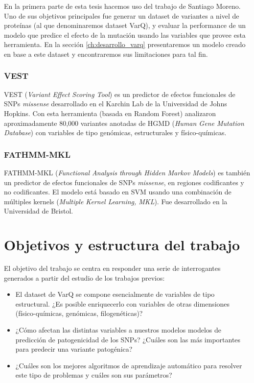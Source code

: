 En la primera parte de esta tesis hacemos uso del trabajo de Santiago Moreno. Uno de sus objetivos principales fue generar un dataset de variantes a nivel de proteínas (al que denominaremos dataset VarQ), y evaluar la performance de un modelo que predice el efecto de la mutación usando las variables que provee esta herramienta. En la sección \ref{ch:desarrollo_varq} presentaremos un modelo creado en base a este dataset y encontraremos sus limitaciones para tal fin.

\subsubsection{VEST}

VEST (\textit{Variant Effect Scoring Tool}) \cite{Carter2013} es un predictor de efectos funcionales de SNPs \textit{missense} desarrollado en el Karchin Lab de la Universidad de Johns Hopkins. Con esta herramienta (basada en Random Forest) analizaron aproximadamente 80,000 variantes anotadas de HGMD (\textit{Human Gene Mutation Database}) con variables de tipo genómicas, estructurales y físico-químicas.

\subsubsection{FATHMM-MKL}

FATHMM-MKL (\textit{Functional Analysis through Hidden Markov Models}) \cite{Shihab2015} es también un predictor de efectos funcionales de SNPs \textit{missense}, en regiones codificantes y no codificantes. El modelo está basado en SVM usando una combinación de múltiples kernels (\textit{Multiple Kernel Learning, MKL}). Fue desarrollado en la Universidad de Bristol. 



\section{Objetivos y estructura del trabajo}

El objetivo del trabajo se centra en responder una serie de interrogantes generados a partir del estudio de los trabajos previos:

\begin{itemize}
    \item El dataset de VarQ se compone esencialmente de variables de tipo estructural. ¿Es posible enriquecerlo con variables de otras dimensiones (físico-químicas, genómicas, filogenéticas)?
    \item ¿Cómo afectan las distintas variables a nuestros modelos modelos de predicción de patogenicidad de los SNPs? ¿Cuáles son las más importantes para predecir una variante patogénica?
    \item ¿Cuáles son los mejores algoritmos de aprendizaje automático para resolver este tipo de problemas y cuáles son sus parámetros?
    
\end{itemize}

